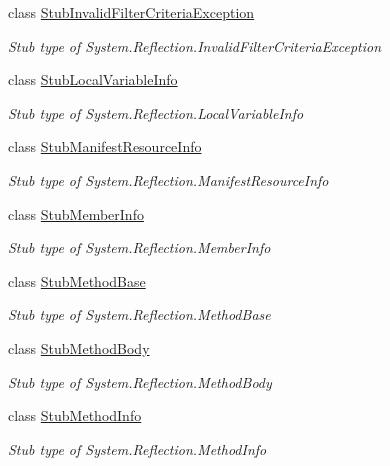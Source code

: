 \begin{DoxyCompactItemize}
class \hyperlink{class_system_1_1_reflection_1_1_fakes_1_1_stub_invalid_filter_criteria_exception}{Stub\-Invalid\-Filter\-Criteria\-Exception}
\begin{DoxyCompactList}\small\item\em Stub type of System.\-Reflection.\-Invalid\-Filter\-Criteria\-Exception\end{DoxyCompactList}\item 
class \hyperlink{class_system_1_1_reflection_1_1_fakes_1_1_stub_local_variable_info}{Stub\-Local\-Variable\-Info}
\begin{DoxyCompactList}\small\item\em Stub type of System.\-Reflection.\-Local\-Variable\-Info\end{DoxyCompactList}\item 
class \hyperlink{class_system_1_1_reflection_1_1_fakes_1_1_stub_manifest_resource_info}{Stub\-Manifest\-Resource\-Info}
\begin{DoxyCompactList}\small\item\em Stub type of System.\-Reflection.\-Manifest\-Resource\-Info\end{DoxyCompactList}\item 
class \hyperlink{class_system_1_1_reflection_1_1_fakes_1_1_stub_member_info}{Stub\-Member\-Info}
\begin{DoxyCompactList}\small\item\em Stub type of System.\-Reflection.\-Member\-Info\end{DoxyCompactList}\item 
class \hyperlink{class_system_1_1_reflection_1_1_fakes_1_1_stub_method_base}{Stub\-Method\-Base}
\begin{DoxyCompactList}\small\item\em Stub type of System.\-Reflection.\-Method\-Base\end{DoxyCompactList}\item 
class \hyperlink{class_system_1_1_reflection_1_1_fakes_1_1_stub_method_body}{Stub\-Method\-Body}
\begin{DoxyCompactList}\small\item\em Stub type of System.\-Reflection.\-Method\-Body\end{DoxyCompactList}\item 
class \hyperlink{class_system_1_1_reflection_1_1_fakes_1_1_stub_method_info}{Stub\-Method\-Info}
\begin{DoxyCompactList}\small\item\em Stub type of System.\-Reflection.\-Method\-Info\end{DoxyCompactList}\item 

\end{DoxyCompactItemize}
